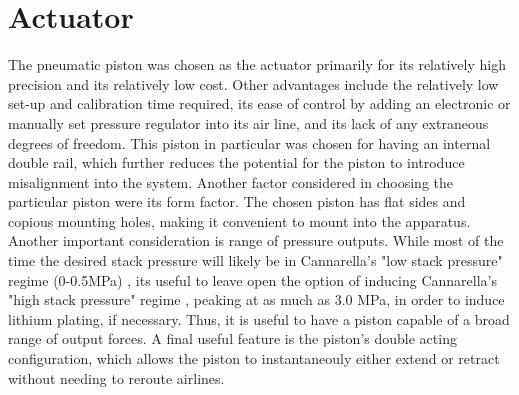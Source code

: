 \section{Actuator}
The pneumatic piston was chosen as the actuator primarily for its relatively high precision and its relatively low cost. Other advantages include the relatively low set-up and calibration time required, its ease of control by adding an electronic or manually set pressure regulator into its air line, and its lack of any extraneous degrees of freedom. This piston in particular was chosen for having an internal double rail, which further reduces the potential for the piston to introduce misalignment into the system. Another factor considered in choosing the particular piston were its form factor. The chosen piston has flat sides and copious mounting holes, making it convenient to mount into the apparatus. Another important consideration is range of pressure outputs. While most of the time the desired stack pressure will likely be in Cannarella's "low stack pressure" regime (0-0.5MPa) \cite{STACK-STRESS}, its useful to leave open the option of inducing Cannarella's "high stack pressure" regime \cite{STACK-STRESS}, peaking at as much as 3.0 MPa, in order to induce lithium plating, if necessary.  Thus, it is useful to have a piston capable of a broad range of output forces. A final useful feature is the piston's double acting configuration, which allows the piston to instantaneouly either extend or retract without needing to reroute airlines.
    